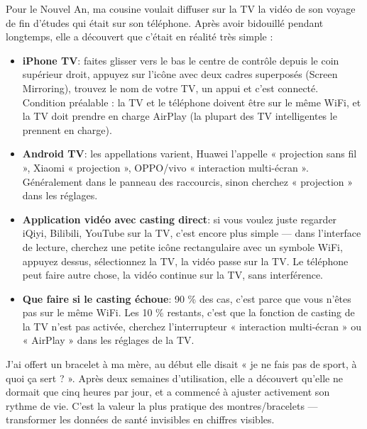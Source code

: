 
Pour le Nouvel An, ma cousine voulait diffuser sur la TV la vidéo de son voyage de fin d'études qui était sur son téléphone. Après avoir bidouillé pendant longtemps, elle a découvert que c'était en réalité très simple :

\begin{itemize}
  \item \textbf{iPhone TV}: faites glisser vers le bas le centre de contrôle depuis le coin supérieur droit, appuyez sur l'icône avec deux cadres superposés (Screen Mirroring), trouvez le nom de votre TV, un appui et c'est connecté. Condition préalable : la TV et le téléphone doivent être sur le même WiFi, et la TV doit prendre en charge AirPlay (la plupart des TV intelligentes le prennent en charge).
  \item \textbf{Android TV}: les appellations varient, Huawei l'appelle « projection sans fil », Xiaomi « projection », OPPO/vivo « interaction multi-écran ». Généralement dans le panneau des raccourcis, sinon cherchez « projection » dans les réglages.
  \item \textbf{Application vidéo avec casting direct}: si vous voulez juste regarder iQiyi, Bilibili, YouTube sur la TV, c'est encore plus simple — dans l'interface de lecture, cherchez une petite icône rectangulaire avec un symbole WiFi, appuyez dessus, sélectionnez la TV, la vidéo passe sur la TV. Le téléphone peut faire autre chose, la vidéo continue sur la TV, sans interférence.
  \item \textbf{Que faire si le casting échoue}: 90 \% des cas, c'est parce que vous n'êtes pas sur le même WiFi. Les 10 \% restants, c'est que la fonction de casting de la TV n'est pas activée, cherchez l'interrupteur « interaction multi-écran » ou « AirPlay » dans les réglages de la TV.
\end{itemize}


J'ai offert un bracelet à ma mère, au début elle disait « je ne fais pas de sport, à quoi ça sert ? ». Après deux semaines d'utilisation, elle a découvert qu'elle ne dormait que cinq heures par jour, et a commencé à ajuster activement son rythme de vie. C'est la valeur la plus pratique des montres/bracelets — transformer les données de santé invisibles en chiffres visibles.

